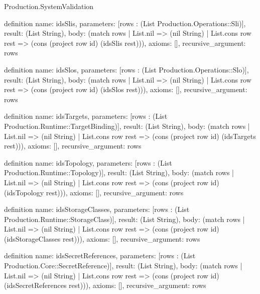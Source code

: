 \begin{lexlean}{Production.SystemValidation}
\begin{semanticmodule}
definition{
  name: idsSlis,
  parameters: [rows : (List Production.Operations::Sli)],
  result: (List String),
  body: (match rows
    | List.nil => (nil String)
    | List.cons row rest => (cons (project row id) (idsSlis rest))),
  axioms: [],
  recursive_argument: rows
}

definition{
  name: idsSlos,
  parameters: [rows : (List Production.Operations::Slo)],
  result: (List String),
  body: (match rows
    | List.nil => (nil String)
    | List.cons row rest => (cons (project row id) (idsSlos rest))),
  axioms: [],
  recursive_argument: rows
}

definition{
  name: idsTargets,
  parameters: [rows : (List Production.Runtime::TargetBinding)],
  result: (List String),
  body: (match rows
    | List.nil => (nil String)
    | List.cons row rest => (cons (project row id) (idsTargets rest))),
  axioms: [],
  recursive_argument: rows
}

definition{
  name: idsTopology,
  parameters: [rows : (List Production.Runtime::Topology)],
  result: (List String),
  body: (match rows
    | List.nil => (nil String)
    | List.cons row rest => (cons (project row id) (idsTopology rest))),
  axioms: [],
  recursive_argument: rows
}

definition{
  name: idsStorageClasses,
  parameters: [rows : (List Production.Runtime::StorageClass)],
  result: (List String),
  body: (match rows
    | List.nil => (nil String)
    | List.cons row rest => (cons (project row id) (idsStorageClasses rest))),
  axioms: [],
  recursive_argument: rows
}

definition{
  name: idsSecretReferences,
  parameters: [rows : (List Production.Core::SecretReference)],
  result: (List String),
  body: (match rows
    | List.nil => (nil String)
    | List.cons row rest => (cons (project row id) (idsSecretReferences rest))),
  axioms: [],
  recursive_argument: rows
}


\end{semanticmodule}
\end{lexlean}
